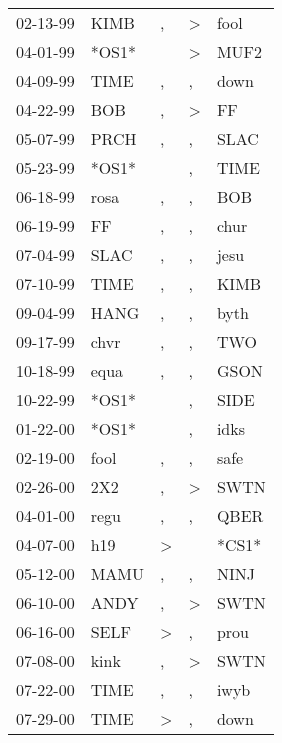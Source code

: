 \begin{supertabular}{lllll}
 02-13-99 &   KIMB &                , &  \textgreater &   fool \\
 04-01-99 &  *OS1* &                  &  \textgreater &   MUF2 \\
 04-09-99 &   TIME &                , &             , &   down \\
 04-22-99 &    BOB &                , &  \textgreater &     FF \\
 05-07-99 &   PRCH &                , &             , &   SLAC \\
 05-23-99 &  *OS1* &                  &             , &   TIME \\
 06-18-99 &   rosa &                , &             , &    BOB \\
 06-19-99 &     FF &                , &             , &   chur \\
 07-04-99 &   SLAC &                , &             , &   jesu \\
 07-10-99 &   TIME &                , &             , &   KIMB \\
 09-04-99 &   HANG &                , &             , &   byth \\
 09-17-99 &   chvr &                , &             , &    TWO \\
 10-18-99 &   equa &                , &             , &   GSON \\
 10-22-99 &  *OS1* &                  &             , &   SIDE \\
 01-22-00 &  *OS1* &                  &             , &   idks \\
 02-19-00 &   fool &                , &             , &   safe \\
 02-26-00 &    2X2 &                , &  \textgreater &   SWTN \\
 04-01-00 &   regu &                , &             , &   QBER \\
 04-07-00 &    h19 &     \textgreater &               &  *CS1* \\
 05-12-00 &   MAMU &                , &             , &   NINJ \\
 06-10-00 &   ANDY &                , &  \textgreater &   SWTN \\
 06-16-00 &   SELF &     \textgreater &             , &   prou \\
 07-08-00 &   kink &                , &  \textgreater &   SWTN \\
 07-22-00 &   TIME &                , &             , &   iwyb \\
 07-29-00 &   TIME &     \textgreater &             , &   down \\

\end{supertabular}

